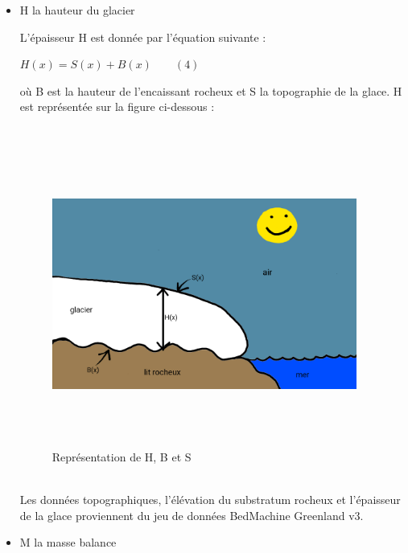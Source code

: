 \documentclass{article}
\begin{document}
\begin{itemize}[label=]
\item H la hauteur du glacier 

L'épaisseur H est donnée par l'équation suivante : 
\begin{center}
$H(x) = S(x) + B(x)\qquad(4)$
\end{center}
où B est la hauteur de l'encaissant rocheux et S la topographie de la glace. H est représentée sur la figure ci-dessous : 
\\
\\
\begin{figure}[!htpb]
\centering
\includegraphics[width=10cm, keepaspectratio=true, height=10cm]{H.png}
\caption{Représentation de H, B et S}
\label{fig01ch1}
\end{figure}
\\

Les données topographiques, l'élévation du substratum rocheux et l'épaisseur de la glace proviennent du jeu de données BedMachine Greenland v3. 
\\
\item M la masse balance  


\end{itemize}
\end{document}
